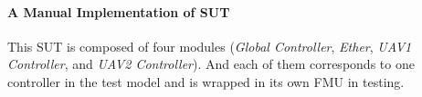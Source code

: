 \paragraph{A Manual Implementation of SUT}
This SUT is composed of four modules (\emph{Global Controller}, \emph{Ether}, \emph{UAV1 Controller}, and \emph{UAV2 Controller}). And each of them corresponds to one controller in the test model and is wrapped in its own FMU in testing. 

%
%
%
%
%
%
%
%
%
%
%
%
%
%
%
